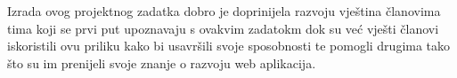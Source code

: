         Izrada ovog projektnog zadatka dobro je doprinijela razvoju vještina članovima tima koji se prvi put upoznavaju s ovakvim zadatokm dok su već vješti članovi iskoristili ovu priliku kako bi usavršili svoje sposobnosti te pomogli drugima tako što su im prenijeli svoje znanje o razvoju web aplikacija.
\begin{comment}		
		 \textit{U ovom poglavlju potrebno je napisati osvrt na vrijeme izrade projektnog zadatka, koji su tehnički izazovi prepoznati, jesu li riješeni ili kako bi mogli biti riješeni, koja su znanja stečena pri izradi projekta, koja bi znanja bila posebno potrebna za brže i kvalitetnije ostvarenje projekta i koje bi bile perspektive za nastavak rada u projektnoj grupi.}

		 \textit{Potrebno je točno popisati funkcionalnosti koje nisu implementirane u ostvarenoj aplikaciji.}
		
\end{comment}


